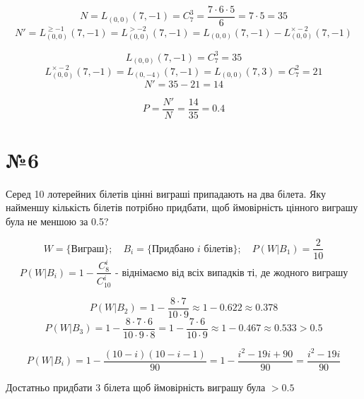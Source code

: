 \documentclass[11pt, a4paper]{article} %
\begin{document}
$$N = L_{(0,0)}(7,-1) = C_7^3 = \frac{7\cdot 6 \cdot 5}{6} = 7\cdot 5 = 35$$
$$N' = L_{(0,0)}^{\ge -1}(7,-1) = L_{(0,0)}^{> -2}(7,-1) = L_{(0,0)}(7,-1) - L_{(0,0)}^{\times -2}(7,-1)$$

$$L_{(0,0)}(7,-1) = C_7^3 = 35$$
$$L_{(0,0)}^{\times -2}(7,-1) = L_{(0,-4)}(7,-1) = L_{(0,0)}(7,3) = C_7^2 = 21$$
$$N' = 35 - 21 = 14$$

\begin{mdframed}[style=ans]
    
    $$P = \frac{N'}{N} = \frac{14}{35} = 0.4$$
\end{mdframed}

\section*{№6}
\begin{mdframed}
    Серед 10 лотерейних білетів цінні виграші припадають на два білета. Яку
найменшу кількість білетів потрібно придбати, щоб ймовірність цінного
виграшу була не меншою за 0.5?
\end{mdframed}
$$W = \{\text{Виграш}\};\quad B_i = \{\text{Придбано $i$ білетів}\};\quad P(W|B_1) = \frac{2}{10}$$
$$P(W|B_i) = 1-\frac{C_8^i}{C_{10}^i} \text{ - віднімаємо від всіх випадків ті, де жодного виграшу}$$

$$P(W|B_2) = 1 - \frac{8\cdot 7}{10\cdot 9} \approx 1 - 0.622 \approx 0.378$$
$$P(W|B_3) = 1 - \frac{8\cdot 7 \cdot 6}{10\cdot 9 \cdot 8} = 1 - \frac{7 \cdot 6}{10 \cdot 9} \approx 1 - 0.467 \approx 0.533 > 0.5$$

$$P(W|B_i) = 1 - \frac{(10-i)(10-i-1)}{90} = 1 - \frac{i^2 - 19i + 90}{90} = \frac{i^2 - 19i}{90}$$

\begin{mdframed}[style=ans]
    Достатньо придбати 3 білета щоб ймовірність виграшу була $> 0.5$
\end{mdframed}
\end{document}
